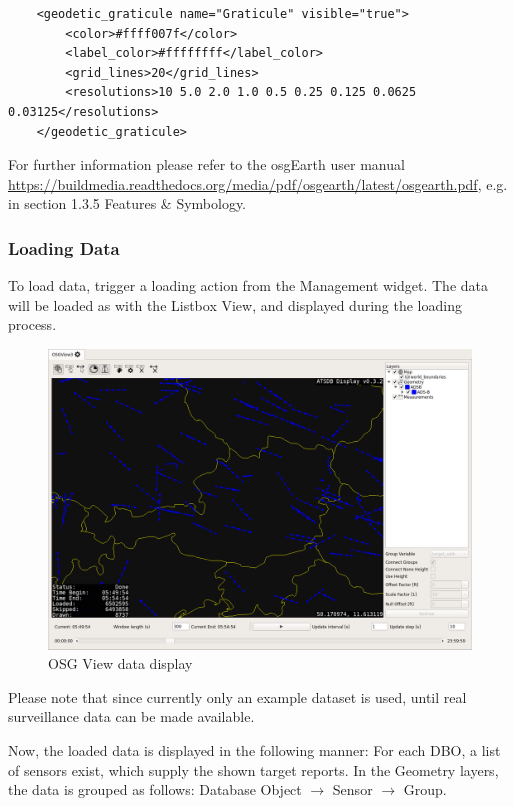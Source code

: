 {\begin{verbatim}
    <geodetic_graticule name="Graticule" visible="true">
        <color>#ffff007f</color>
        <label_color>#ffffffff</label_color>
        <grid_lines>20</grid_lines>
        <resolutions>10 5.0 2.0 1.0 0.5 0.25 0.125 0.0625 0.03125</resolutions>
    </geodetic_graticule>
\end{verbatim}


For further information please refer to the osgEarth user manual \url{https://buildmedia.readthedocs.org/media/pdf/osgearth/latest/osgearth.pdf}, e.g. in section 1.3.5 Features \& Symbology.


\subsubsection{Loading Data}
To load data, trigger a loading action from the Management widget. The data will be loaded as with the Listbox View, and displayed during the loading process. 

\begin{figure}[H]
    \hspace*{-2cm}
    \includegraphics[width=18cm,frame]{../screenshots/osgview_data.png}
  \caption{OSG View data display}
  \label{fig:osgview_data}
\end{figure}

Please note that since currently only an example dataset is used, until real surveillance data can be made available.

Now, the loaded data is displayed in the following manner: For each DBO, a list of sensors exist, which supply the shown target reports. In the Geometry layers, the data is grouped as follows: Database Object $\rightarrow$ Sensor $\rightarrow$ Group. \\

}
